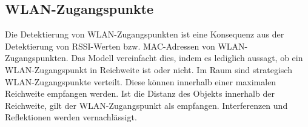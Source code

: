 \subsection{WLAN-Zugangspunkte}
Die Detektierung von WLAN-Zugangspunkten ist eine Konsequenz aus der Detektierung von RSSI-Werten bzw. MAC-Adressen von WLAN-Zugangspunkten.
Das Modell vereinfacht dies, indem es lediglich aussagt, ob ein WLAN-Zugangspunkt in Reichweite ist oder nicht.
\newline
\newline
Im Raum sind strategisch WLAN-Zugangspunkte verteilt.
Diese können innerhalb einer maximalen Reichweite empfangen werden.
Ist die Distanz des Objekts innerhalb der Reichweite, gilt der WLAN-Zugangspunkt als empfangen.
Interferenzen und Reflektionen werden vernachlässigt.